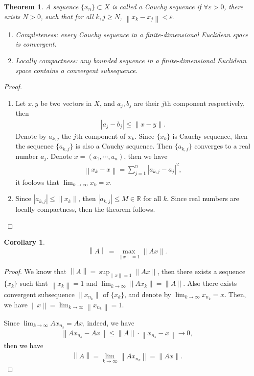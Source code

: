 \documentclass[10pt]{book}
\newtheorem{theorem}{Theorem}[chapter]
\newtheorem{corollary}{Corollary}[theorem]
\theoremstyle{definition}
\numberwithin{equation}{chapter}
\begin{document}
\begin{theorem}\label{cauchy_sequence_eclidean_theorem}
A sequence $\{x_n\}\subset X$ is called a Cauchy sequence if $\forall \varepsilon > 0$, there exists $N > 0$,  such that for all $k, j \geq N$, $\left\|x_k - x_j\right\| < \varepsilon$. 
\begin{enumerate}[label=(\alph*)]
    \item Completeness: every Cauchy sequence in a finite-dimensional Euclidean space is convergent.
    \item Locally compactness: any bounded sequence in a finite-dimensional Euclidean space contains a convergent subsequence. 
\end{enumerate}
\end{theorem}
\begin{proof}
~\begin{enumerate}[label=(\alph*)]
    \item Let $x,y$ be two vectors in $X$, and $a_j, b_j$ are their $j$th component respectively, then 
    \begin{align*}
        \left|a_j - b_j\right| \leq \|x - y\|.
    \end{align*}
    Denote by $a_{k,j}$ the $j$th component of $x_k$. Since $\{x_k\}$ is Cauchy sequence, then the sequence $\{a_{k,j}\}$ is also a Cauchy sequence. Then $\{a_{k,j}\}$ converges to a real number $a_j$. Denote $x = (a_1, \cdots, a_n)$, then we have 
    \begin{align*}
        \left\|x_k - x\right\| = \sum^n_{j=1} \left|a_{k,j} - a_j\right|^2,
    \end{align*}
    it foolows that $\lim_{k\to\infty} x_k = x$.
    \item Since $\left|a_{k,j}\right| \leq \|x_k\|$, then $\left|a_{k,j}\right| \leq M \in\mathbb{R}$ for all $k$. Since real numbers are locally compactness, then the theorem follows.
\end{enumerate}

\end{proof}

\medskip

\begin{corollary}
$$\left\|A\right\| = \max_{\|x\| = 1} \|Ax\|.$$
\end{corollary}
\begin{proof}
We know that $\left\|A\right\| = \sup_{\|x\| = 1} \|Ax\|$, then there exists a sequence $\{x_k\}$ such that $\left\|x_k\right\| = 1$ and $\lim_{k\to\infty} \left\|Ax_k\right\| = \|A\|$. Also there exists convergent subsequence $\|x_{n_k}\|$ of $\{x_k\}$, and denote by $\lim_{k\to\infty} x_{n_k} = x$. Then, we have $\left\|x\right\| = \lim_{k\to\infty} \left\|x_{n_k}\right\| = 1$. 

Since $\lim_{k\to\infty} Ax_{n_k} = Ax$, indeed, we have
\begin{align*}
    \left\|Ax_{n_k} - Ax\right\| \leq \|A\| \cdot \left\|x_{n_k} - x\right\| \to 0,
\end{align*}
then we have 
\begin{align*}
    \left\|A\right\| = \lim_{k\to\infty} \left\|Ax_{n_k}\right\| = \|Ax\|.
\end{align*}
\end{proof}
\end{document}
